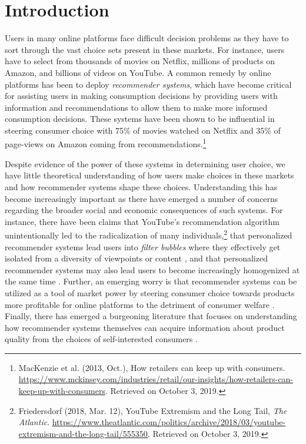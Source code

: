 \documentclass[format=acmsmall, review=false]{acmart}
\title[\PaperTitle]{\PaperTitle}
\author{Submission 42?}
\begin{document}
\maketitle


\section{Introduction}

Users in many online platforms face difficult decision problems as they have to sort through the vast choice sets present in these markets. For instance, users have to select from thousands of movies on Netflix, millions of products on Amazon, and billions of videos on YouTube. A common remedy by online platforms has been to deploy \textit{recommender systems}, which have become critical for assisting users in making consumption decisions by providing users with information and recommendations to allow them to make more informed consumption decisions. These systems have been shown to be influential in steering consumer choice with 75\% of movies watched on Netflix and 35\% of page-views on Amazon coming from recommendations.\footnote{MacKenzie et al. (2013, Oct.),  How retailers can keep up with consumers. 
\url{https://www.mckinsey.com/industries/retail/our-insights/how-retailers-can-keep-up-with-consumers}. 
Retrieved on October 3, 2019.}
\par 
Despite evidence of the power of these systems in determining user choice, we have little theoretical understanding of how users make choices in these markets and how recommender systems shape these choices. Understanding this has become increasingly important as there have emerged a number of concerns regarding the broader social and economic consequences of such systems. For instance, there have been claims that YouTube's recommendation algorithm unintentionally led to the radicalization of many individuals,\footnote{Friedersdorf (2018, Mar. 12), YouTube Extremism and the Long Tail, 
\textit{The Atlantic}. 
\url{https://www.theatlantic.com/politics/archive/2018/03/youtube-extremism-and-the-long-tail/555350}. Retrieved on October 3, 2019.} 
that personalized recommender systems lead users into \textit{filter bubbles} 
where they effectively get isolated from a diversity of viewpoints or content 
\cite{pariser2011filter}, and that personalized recommender systems may also lead users to become increasingly homogenized at the same time \cite{chaney2018algorithmic, hosanagar2013will}. Further, an emerging worry is that recommender systems can be utilized as a tool of market power by steering consumer choice towards products more profitable for online platforms to the detriment of consumer welfare \citep{aridor2020recommender, bourreau2018streaming, DeCorniereTaylor2019RAND}. Finally, there has emerged a burgeoning literature that focuses on understanding how recommender systems themselves can acquire information about product quality from the choices of self-interested consumers \cite{kremer2014implementing, che2017recommender,frazier2014incentivizing,mansour2015bayesian}. 
\end{document}
